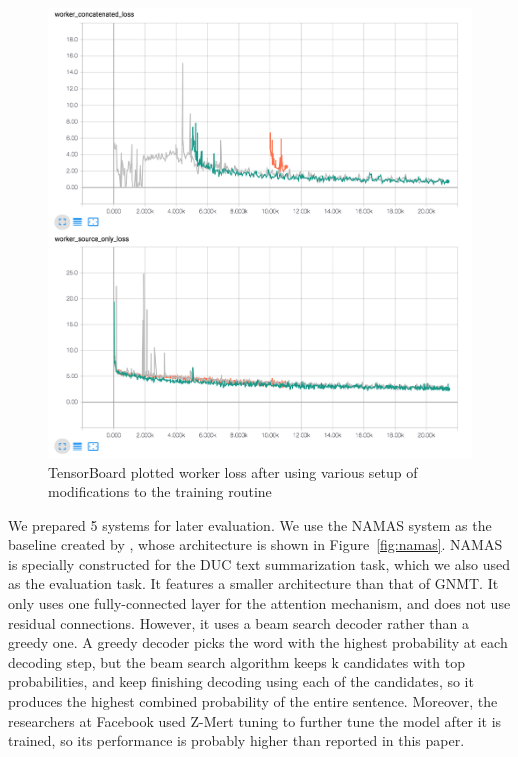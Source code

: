 \documentclass[letterpaper]{article} %
\begin{document}
\begin{figure}[h]
	\includegraphics[scale=0.3]{worker_loss_after}
	\centering
	\caption{TensorBoard plotted worker loss after using various setup of modifications to the training routine}
	\label{fig:workerlossafter}
\end{figure}

We prepared 5 systems for later evaluation. We use the NAMAS system as the baseline created by \cite{rush2015neural}, whose architecture is shown in Figure~\ref{fig:namas}. NAMAS is specially constructed for the DUC text summarization task, which we also used as the evaluation task. It features a smaller architecture than that of GNMT. It only uses one fully-connected layer for the attention mechanism, and does not use residual connections. However, it uses a beam search decoder rather than a greedy one. A greedy decoder picks the word with the highest probability at each decoding step, but the beam search algorithm keeps k candidates with top probabilities, and keep finishing decoding using each of the candidates, so it produces the highest combined probability of the entire sentence. Moreover, the researchers at Facebook used Z-Mert tuning to further tune the model after it is trained, so its performance is probably higher than reported in this paper.
\end{document}
